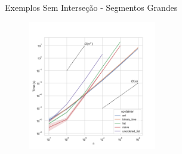 \documentclass[aspectratio=169,usenames,dvipsnames]{beamer}
\begin{document}
\begin{frame}{Exemplos Sem Interseção - Segmentos Grandes}
     \begin{figure}
        \includegraphics[width=0.5\textwidth]{figs/tempos/plot_big_detection_time.pdf}
      \end{figure}
\end{frame}
\end{document}
